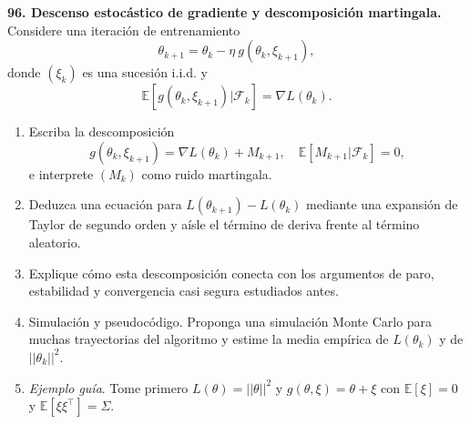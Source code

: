\documentclass[11pt, letterpaper]{article}
\begin{document}
\begin{ejercicio}
    \textbf{96. Descenso estocástico de gradiente y descomposición martingala.} Considere una iteración de entrenamiento
    \[ \theta_{k+1}=\theta_{k}-\eta~g(\theta_{k},\xi_{k+1}), \]
    donde $(\xi_{k})$ es una sucesión i.i.d. y
    \[ \mathbb{E}[g(\theta_{k},\xi_{k+1})|\mathcal{F}_{k}]=\nabla L(\theta_{k}). \]
    \begin{enumerate}
        \item Escriba la descomposición
        \[ g(\theta_{k},\xi_{k+1})=\nabla L(\theta_{k})+M_{k+1}, \quad \mathbb{E}[M_{k+1}|\mathcal{F}_{k}]=0, \]
        e interprete $(M_{k})$ como ruido martingala.
        \item Deduzca una ecuación para $L(\theta_{k+1})-L(\theta_{k})$ mediante una expansión de Taylor de segundo orden y aísle el término de deriva frente al término aleatorio.
        \item Explique cómo esta descomposición conecta con los argumentos de paro, estabilidad y convergencia casi segura estudiados antes.
        \item Simulación y pseudocódigo. Proponga una simulación Monte Carlo para muchas trayectorias del algoritmo y estime la media empírica de $L(\theta_{k})$ y de $||\theta_{k}||^{2}$.
        \item \textit{Ejemplo guía}. Tome primero $L(\theta) = ||\theta||^2$ y $g(\theta,\xi) = \theta + \xi$ con $\mathbb{E}[\xi]=0$ y $\mathbb{E}[\xi\xi^{\top}]=\Sigma$.
    \end{enumerate}
\end{ejercicio}

\vspace{5mm}
\end{document}
